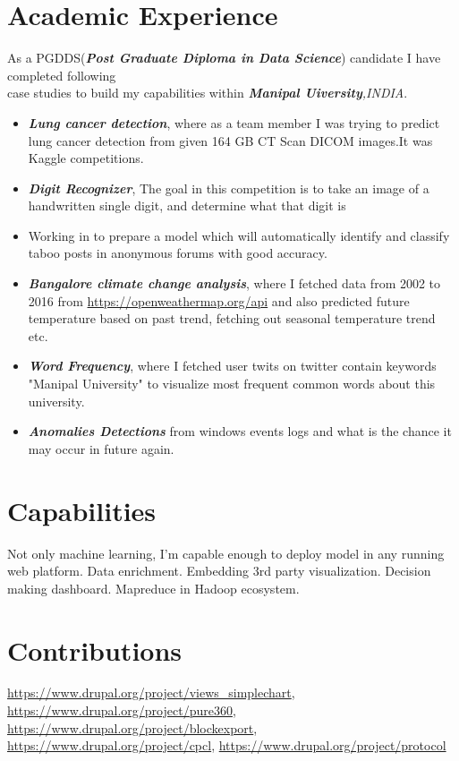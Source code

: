 \documentclass{article}
\begin{document}
\thispagestyle{empty}
\section{Academic Experience}
As a PGDDS(\textit{\textbf{Post Graduate Diploma in Data Science}}) candidate I have completed following\\ case studies to build my capabilities within \textit{\textbf{Manipal Uiversity},INDIA}.
\begin{itemize}[leftmargin=*]
  \item \textit{\textbf{Lung cancer detection}}, where as a team member I was trying to predict lung cancer detection from given 164 GB CT Scan DICOM images.It was Kaggle competitions.
  \item \textit{\textbf{Digit Recognizer}}, The goal in this competition is to take an image of a handwritten single digit, and determine what that digit is
  \item Working in to prepare a model which will automatically identify and classify taboo posts in anonymous forums with good accuracy.
  \item \textit{\textbf{Bangalore climate change analysis}}, where I fetched data from 2002 to 2016 from \url{https://openweathermap.org/api} and also predicted future temperature based on past trend, fetching out seasonal temperature trend etc.
  \item \textit{\textbf{Word Frequency}}, where I fetched user twits on twitter contain keywords "Manipal University" to visualize most frequent common words about this university.
  \item \textit{\textbf{Anomalies Detections}} from windows events logs and what is the chance it may occur in future again.
\end{itemize}

\section{Capabilities}
Not only machine learning, I'm capable enough to deploy model in any running web platform. Data enrichment. Embedding 3rd party visualization. Decision making dashboard. Mapreduce in Hadoop ecosystem.

\section{Contributions}
\url{https://www.drupal.org/project/views_simplechart}, \url{https://www.drupal.org/project/pure360}, \url{https://www.drupal.org/project/blockexport}, \url{https://www.drupal.org/project/cpcl}, \url{https://www.drupal.org/project/protocol}
\end{document}
